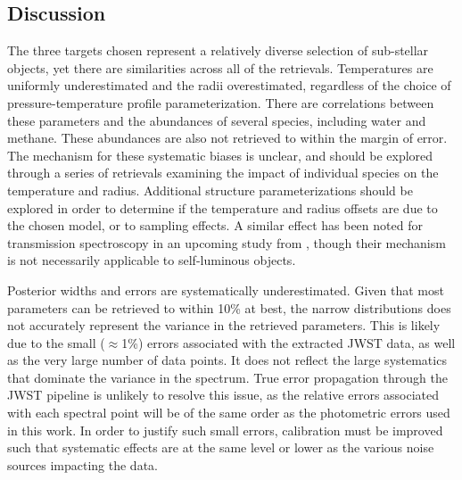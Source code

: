 \subsection{Discussion}
The three targets chosen represent a relatively diverse selection of sub-stellar objects, yet there are similarities across all of the retrievals.
Temperatures are uniformly underestimated and the radii overestimated, regardless of the choice of pressure-temperature profile parameterization.
There are correlations between these parameters and the abundances of several species, including water and methane.
These abundances are also not retrieved to within the margin of error.
The mechanism for these systematic biases is unclear, and should be explored through a series of retrievals examining the impact of individual species on the temperature and radius.
Additional structure parameterizations should be explored in order to determine if the temperature and radius offsets are due to the chosen model, or to sampling effects.
A similar effect has been noted for transmission spectroscopy in an upcoming study from \parencite{MacDonald2020}, though their mechanism is not necessarily applicable to self-luminous objects.

Posterior widths and errors are systematically underestimated. 
Given that most parameters can be retrieved to within 10\% at best, the narrow distributions does not accurately represent the variance in the retrieved parameters.
This is likely due to the small ($\approx$1\%) errors associated with the extracted JWST data, as well as the very large number of data points.
It does not reflect the large systematics that dominate the variance in the spectrum.
True error propagation through the JWST pipeline is unlikely to resolve this issue, as the relative errors associated with each spectral point will be of the same order as the photometric errors used in this work.
In order to justify such small errors, calibration must be improved such that systematic effects are at the same level or lower as the various noise sources impacting the data.

